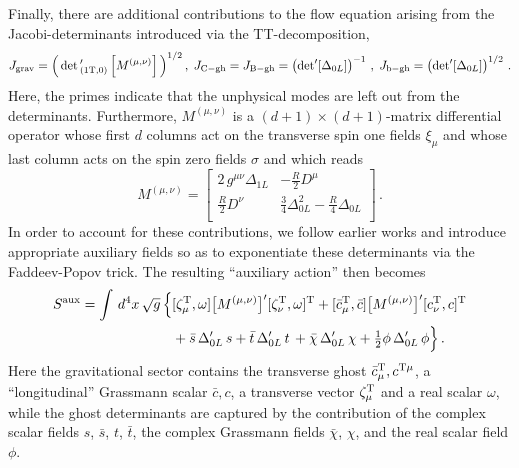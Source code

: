 \documentclass[preprint,preprintnumbers,amsmath,amssymb,nofootinbib,APS]{revtex4}
\newcommand{\be}{\begin{equation}}
\newcommand{\ee}{\end{equation}}
\newcommand{\2}{\sqrt{2\,}}
\newcommand{\cb}{\bar{c}}
\begin{document}
\begin{appendix}
Finally, there are additional contributions to the flow equation arising from the Jacobi-determinants introduced via the TT-decomposition,
%
\be
\begin{split}
J_{\rm grav} = \Big( \det{}_{\rm (1T,0)}^\prime\left[ M^{(\mu, \nu)} \right] \Big)^{1/2} \,,\;
J_{\rm C-gh} =  J_{\rm B-gh} =\left( {\det}^\prime[\Delta_{0L}]\right)^{-1}\,,\;
J_{\rm b-gh} =  \left( {\det}^\prime[\Delta_{0L}]\right)^{1/2}\,.
\end{split}
\ee
%
Here, the primes indicate that the unphysical modes are left out from the determinants. Furthermore, $M^{(\mu, \nu)}$ is a $(d+1) \times (d+1)$-matrix differential operator whose first $d$ columns act on the transverse spin one fields $\xi_\mu$ and whose last column acts on the spin zero fields $\sigma$ and which reads
%
\be
M^{(\mu, \nu)} = \left[ 
\begin{array}{cc}
 2 \, g^{\mu \nu} \Delta_{1L} & -  \frac{R}{2} D^\mu \\
\frac{R}{2}D^\nu & \frac{3}{4} \Delta_{0L}^2 - \frac{R}{4}\Delta_{0L} \\
\end{array}
\right] \, .
\ee
%
In order to account for these contributions, we follow earlier works
\cite{Codello:2007bd,Machado:2007ea,Codello:2008vh} and introduce appropriate auxiliary fields
 so as to exponentiate these determinants via the Faddeev-Popov trick.
 The resulting ``auxiliary action'' then becomes
%
\be\label{Saux}
\begin{split}
S^{\rm aux} = \int \, d^4x \, \sqrt{g} \, \Big\{ & 
[\zeta^{{\rm T}}_\mu, \omega] \big[ M^{(\mu ,\nu)} \big]^\prime  [\zeta^{{\rm T}}_\nu, \omega]^{\rm T} +
 [\cb^{{\rm T} }_\mu, \bar{c}] \big[ M^{(\mu ,\nu)} \big]^\prime  [c^{\rm T}_\nu, c]^{\rm T} \\ &
+ \bar{s} \, \Delta_{0L}^\prime \, s  + \bar{t} \, \Delta_{0L}^\prime \,t
\,+\bar{\chi}\,\Delta_{0L}^\prime\,\chi +\tfrac{1}{2} \phi\,\Delta_{0L}^\prime\,\phi \Big\} \,  .
\end{split}
\ee
%
Here the gravitational sector contains the transverse ghost $\cb^{\rm T}_\mu, c^{{\rm T}\mu}$, a ``longitudinal'' Grassmann scalar $\cb, c$, a transverse vector $\zeta^{\rm T}_\mu$ and a real scalar $\omega$, while the ghost determinants are captured by the contribution of the complex scalar fields $s$, $\bar{s}$, $t$, $\bar{t}$, the complex Grassmann fields $\bar{\chi}$, $\chi$, and the real scalar field $\phi$.


\end{appendix}
\end{document}
